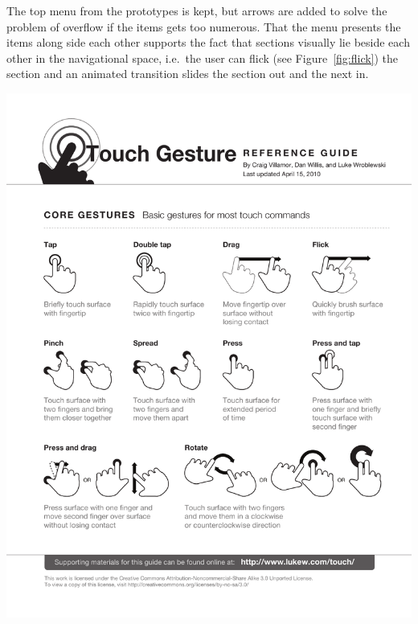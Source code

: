 \begin{figure}
{}
\end{figure}

The top menu from the prototypes is kept, but arrows are added to solve the problem of overflow if the items gets too numerous. That the menu presents the items along side each other supports the fact that sections visually lie beside each other in the navigational space, i.e.\ the user can flick (see Figure~\ref{fig:flick}) the section and an animated transition slides the section out and the next in.
\begin{sidefigure}[h!tp]
	\myfloatalign
	\includegraphics[width=\marginparwidth]{img/flick}
	\caption{Touch gesture: Quickly brush surface with fingertip.}
	\label{fig:flick}
\end{sidefigure}

